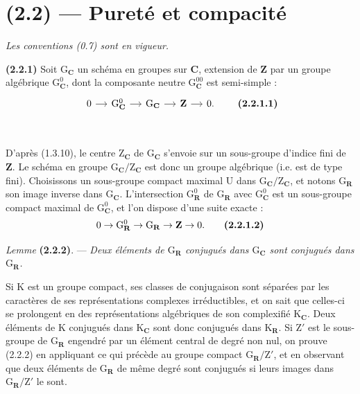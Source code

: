 \documentclass[11pt,leqno]{article}
\newcommand{\Page}[1]{\ifvmode\noindent\else\unskip\ \fi{\footnotesize\textcolor{gray}{[p.\,#1]}}\ \ignorespaces}
\begin{document}
\section*{(2.2) — Pureté et compacité}

\textit{Les conventions \textup{(0.7)} sont en vigueur.}

\textbf{(2.2.1)} Soit \(\mathrm{G}_{\mathbf{C}}\) un schéma en groupes sur \(\mathbf{C}\), extension de \(\mathbf{Z}\) par un groupe algébrique \(\mathrm{G}_{\mathbf{C}}^0\), dont la composante neutre \(\mathrm{G}_{\mathbf{C}}^{00}\) est semi-simple :
\[
\begin{tikzcd}[column sep=1.2em]
0 \arrow[r]
  & \mathrm{G}_{\mathbf{C}}^0 \arrow[r]
  & \mathrm{G}_{\mathbf{C}} \arrow[r]
  & \mathbf{Z} \arrow[r]
  & 0.
\end{tikzcd}
\tag*{\textbf{(2.2.1.1)}}
\]

\Page{193}

D’après (1.3.10), le centre \(\mathrm Z_{\mathbf C}\) de \(\mathrm G_{\mathbf C}\) s’envoie sur un sous-groupe d’indice fini de \(\mathbf Z\). Le schéma en groupe \(\mathrm G_{\mathbf C}/\mathrm Z_{\mathbf C}\) est donc un groupe algébrique (i.e. est de type fini). Choisissons un sous-groupe compact maximal \(\mathrm U\) dans \(\mathrm G_{\mathbf C}/\mathrm Z_{\mathbf C}\), et notons \(\mathrm G_{\mathbf R}\) son image inverse dans \(\mathrm G_{\mathbf C}\). L’intersection \(\mathrm G_{\mathbf R}^0\) de \(\mathrm G_{\mathbf R}\) avec \(\mathrm G_{\mathbf C}^0\) est un sous-groupe compact maximal de \(\mathrm G_{\mathbf C}^0\), et l’on dispose d’une suite exacte :
\[
0\to\mathrm G_{\mathbf R}^0\to\mathrm G_{\mathbf R}\to\mathbf Z\to0.
\tag*{\textbf{(2.2.1.2)}}
\]

\textit{Lemme} \textbf{(2.2.2)}. — \textit{Deux éléments de \(\mathrm G_{\mathbf R}\) conjugués dans \(\mathrm G_{\mathbf C}\) sont conjugués dans \(\mathrm G_{\mathbf R}\).}

Si \(\mathrm K\) est un groupe compact, ses classes de conjugaison sont séparées par les caractères de ses représentations complexes irréductibles, et on sait que celles-ci se prolongent en des représentations algébriques de son complexifié \(\mathrm K_{\mathbf C}\). Deux éléments de \(\mathrm K\) conjugués dans \(\mathrm K_{\mathbf C}\) sont donc conjugués dans \(\mathrm K_{\mathbf R}\). Si \(\mathrm Z'\) est le sous-groupe de \(\mathrm G_{\mathbf R}\) engendré par un élément central de degré non nul, on prouve (2.2.2) en appliquant ce qui précède au groupe compact \(\mathrm G_{\mathbf R}/\mathrm Z'\), et en observant que deux éléments de \(\mathrm G_{\mathbf R}\) de même degré sont conjugués si leurs images dans \(\mathrm G_{\mathbf R}/\mathrm Z'\) le sont.
\end{document}
